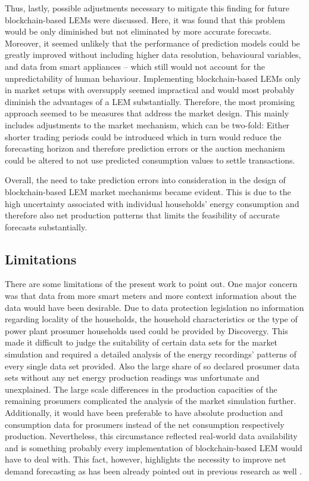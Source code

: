 Thus, lastly, possible adjustments necessary to mitigate this finding for future blockchain-based LEMs were discussed. Here, it was found that this problem would be only diminished but not eliminated by more accurate forecasts. Moreover, it seemed unlikely that the performance of prediction models could be greatly improved without including higher data resolution, behavioural variables, and data from smart appliances -- which still would not account for the unpredictability of human behaviour. Implementing blockchain-based LEMs only in market setups with oversupply seemed impractical and would most probably diminish the advantages of a LEM substantially. Therefore, the most promising approach seemed to be measures that address the market design. This mainly includes adjustments to the market mechanism, which can be two-fold: Either shorter trading periods could be introduced which in turn would reduce the forecasting horizon and therefore prediction errors or the auction mechanism could be altered to not use predicted consumption values to settle transactions.

Overall, the need to take prediction errors into consideration in the design of blockchain-based LEM market mechanisms became evident. This is due to the high uncertainty associated with individual households' energy consumption and therefore also net production patterns that limits the feasibility of accurate forecasts substantially.




\subsection{Limitations}\label{Sec:Conclusion;Subsec:Discussion}

There are some limitations of the present work to point out. One major concern was that data from more smart meters and more context information about the data would have been desirable. Due to data protection legislation no information regarding locality of the households, the household characteristics or the type of power plant prosumer households used could be provided by Discovergy. This made it difficult to judge the suitability of certain data sets for the market simulation and required a detailed analysis of the energy recordings' patterns of every single data set provided. Also the large share of so declared prosumer data sets without any net energy production readings was unfortunate and unexplained. The large scale differences in the production capacities of the remaining prosumers complicated the analysis of the market simulation further. Additionally, it would have been preferable to have absolute production and consumption data for prosumers instead of the net consumption respectively production. Nevertheless, this circumstance reflected real-world data availability and is something probably every implementation of blockchain-based LEM would have to deal with. This fact, however, highlights the necessity to improve net demand forecasting as has been already pointed out in previous research as well \citep[e.g.,][]{Meer:2018, Hong:2016}.


